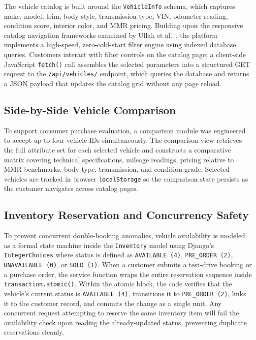 The vehicle catalog is built around the \texttt{VehicleInfo} schema, which captures make, model, trim, body style, transmission type, VIN, odometer reading, condition score, interior color, and MMR pricing. Building upon the responsive catalog navigation frameworks examined by Ullah et al.~\cite{ullah2016developing}, the platform implements a high-speed, zero-cold-start filter engine using indexed database queries. Customers interact with filter controls on the catalog page; a client-side JavaScript \texttt{fetch()} call assembles the selected parameters into a structured GET request to the \texttt{/api/vehicles/} endpoint, which queries the database and returns a JSON payload that updates the catalog grid without any page reload.

\subsection{Side-by-Side Vehicle Comparison}

To support consumer purchase evaluation, a comparison module was engineered to accept up to four vehicle IDs simultaneously. The comparison view retrieves the full attribute set for each selected vehicle and constructs a comparative matrix covering technical specifications, mileage readings, pricing relative to MMR benchmarks, body type, transmission, and condition grade. Selected vehicles are tracked in browser \texttt{localStorage} so the comparison state persists as the customer navigates across catalog pages.

\subsection{Inventory Reservation and Concurrency Safety}

To prevent concurrent double-booking anomalies, vehicle availability is modeled as a formal state machine inside the \texttt{Inventory} model using Django's \texttt{IntegerChoices} where status is defined as \texttt{AVAILABLE (4)}, \texttt{PRE\_ORDER (2)}, \texttt{UNAVAILABLE (0)}, or \texttt{SOLD (1)}. When a customer submits a test-drive booking or a purchase order, the service function wraps the entire reservation sequence inside \texttt{transaction.atomic()}. Within the atomic block, the code verifies that the vehicle's current status is \texttt{AVAILABLE (4)}, transitions it to \texttt{PRE\_ORDER (2)}, links it to the customer record, and commits the change as a single unit. Any concurrent request attempting to reserve the same inventory item will fail the availability check upon reading the already-updated status, preventing duplicate reservations cleanly.

